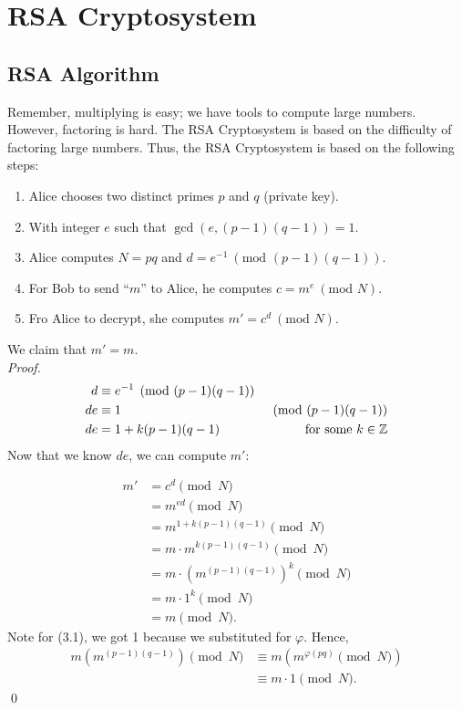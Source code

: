 \section{RSA Cryptosystem}

\hypertarget{sec:RSA Algorithm}{}

\subsection{RSA Algorithm}

Remember, multiplying is easy; we have tools to compute large numbers. However, factoring is hard. The RSA Cryptosystem is based on the difficulty of factoring large numbers. Thus, the RSA Cryptosystem is based on the following steps:
\begin{enumerate}
    \item Alice chooses two distinct primes \(p\) and \(q\) (private key).
    \item With integer \(e\) such that \(\gcd(e, (p-1)(q-1)) = 1\).
    \item Alice computes \(N = pq\) and \(d = e^{-1} \ (\text{mod } (p-1)(q-1))\).
    \item For Bob to send ``\(m\)'' to Alice, he computes \(c = m^e \ (\text{mod } N)\).
    \item Fro Alice to decrypt, she computes \(m' = c^d \ (\text{mod } N)\).
\end{enumerate}
\pfs

We claim that \(m' = m\). \\

\noindent \textit{Proof.} \begin{align*}
    d  & \equiv e^{-1}\pmod{(p-1)(q-1)}                             \\
    de & \equiv 1                       & \pmod{(p-1)(q-1)}         \\
    de & = 1 + k(p-1)(q-1)              & \text{for some } k \in \mathbb{Z}
\end{align*} Now that we know \(de\), we can compute \(m'\):

\begin{align*}
    m' & = c^d \pmod{N}                                  \\
       & = m^{ed} \pmod{N}                               \\
       & = m^{1 + k(p-1)(q-1)} \pmod{N}                  \\
       & = m \cdot m^{k(p-1)(q-1)} \pmod{N}              \\
       & = m \cdot (m^{(p-1)(q-1)})^k \pmod{N} \tag{3.1} \\
       & = m \cdot 1^k \pmod{N}                          \\
       & = m \pmod{N}.
\end{align*} Note for (3.1), we got 1 because we substituted for \(\varphi\). Hence, \begin{align*}
    m (m^{(p-1)(q-1)}) \pmod{N} & \equiv m (m^{\varphi(pq)} \pmod{N}) \\
                                & \equiv m \cdot 1 \pmod{N}.
\end{align*} \qed

